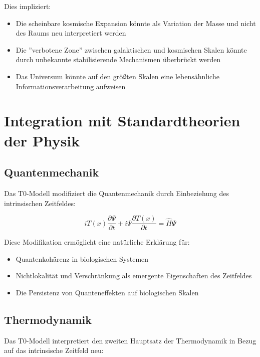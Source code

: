 \documentclass[12pt,a4paper]{article}
\newcommand{\Tfield}{T(x)}
\begin{document}
	Dies impliziert:
	
	\begin{itemize}
		\item Die scheinbare kosmische Expansion könnte als Variation der Masse und nicht des Raums neu interpretiert werden
		\item Die ''verbotene Zone'' zwischen galaktischen und kosmischen Skalen könnte durch unbekannte stabilisierende Mechanismen überbrückt werden
		\item Das Universum könnte auf den größten Skalen eine lebensähnliche Informationsverarbeitung aufweisen
	\end{itemize}
	
	\section{Integration mit Standardtheorien der Physik}
	\label{sec:integration}
	
	\subsection{Quantenmechanik}
	\label{subsec:quantum_integration}
	
	Das T0-Modell modifiziert die Quantenmechanik durch Einbeziehung des intrinsischen Zeitfeldes:
	
	\begin{equation}
		i\Tfield\frac{\partial \Psi}{\partial t} + i\Psi\frac{\partial \Tfield}{\partial t} = \hat{H}\Psi
	\end{equation}
	
	Diese Modifikation ermöglicht eine natürliche Erklärung für:
	
	\begin{itemize}
		\item Quantenkohärenz in biologischen Systemen
		\item Nichtlokalität und Verschränkung als emergente Eigenschaften des Zeitfeldes
		\item Die Persistenz von Quanteneffekten auf biologischen Skalen
	\end{itemize}
	
	\subsection{Thermodynamik}
	\label{subsec:thermodynamics_integration}
	
	Das T0-Modell interpretiert den zweiten Hauptsatz der Thermodynamik in Bezug auf das intrinsische Zeitfeld neu:
	
\end{document}
